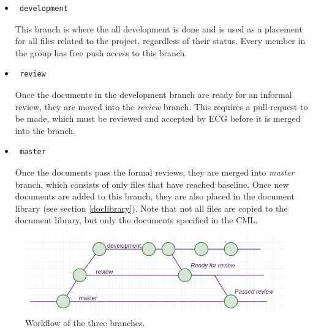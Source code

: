 \documentclass{article}
\begin{document}
            \begin{itemize}
                \item \begin{verbatim} development \end{verbatim}
                This branch is where the all development is done and is used as a placement for all files related
                to the project, regardless of their status.
                Every member in the group has free push access to this branch.
                
                \item \begin{verbatim} review \end{verbatim}
                Once the documents in the development branch are ready for an informal review,  they are moved
                into the \textit{review} branch. This requires a pull-request to be made, which must be reviewed and accepted by ECG before it is merged into the branch. 
                
                \item \begin{verbatim} master \end{verbatim}
                Once the documents pass the formal reviews, they are merged into 
                \textit{master} branch, which consists of only files that have reached baseline.
                Once new documents are added to this branch, they are also placed in the document library (see section \ref{doclibrary}).
                Note that not all files are copied to the document library, but only the documents specified in the CML.
                
            \end{itemize}
            
            \begin{figure}[h]
                \centering
                \includegraphics[width=\textwidth]{images/workflow.png}
                \caption{Workflow of the three branches.}
                \label{workflow}
            \end{figure}
        
\end{document}
